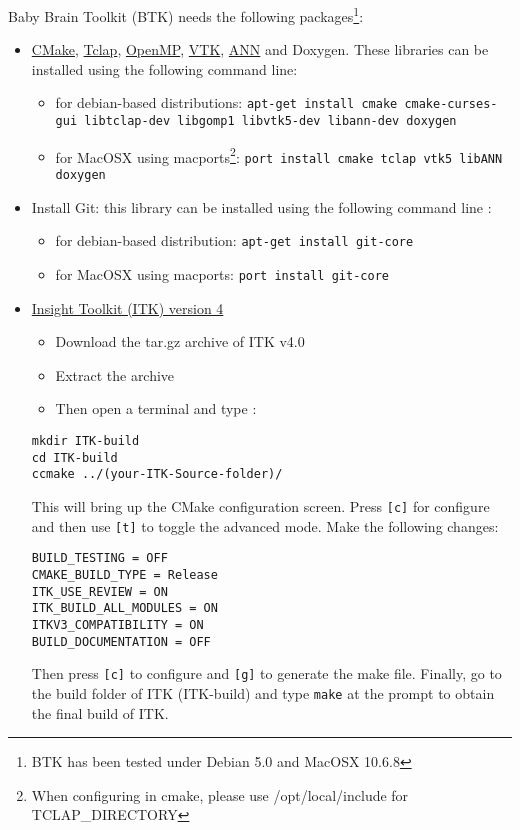 \documentclass[a4paper,10pt]{article}
\begin{document}
Baby Brain Toolkit (BTK) needs the following packages\footnote{BTK has been tested under Debian 5.0 and MacOSX 10.6.8}:
\begin{itemize}
 \item \href{http://www.cmake.org}{CMake}, \href{http://tclap.sourceforge.net}{Tclap}, \href{http://openmp.org}{OpenMP}, \href{http://www.vtk.org}{VTK}, \href{http://www.cs.umd.edu/\string~mount/ANN}{ANN} and Doxygen. These libraries can be installed using the following command line: 
 \begin{itemize}
 \item for debian-based distributions: \texttt{apt-get install cmake
cmake-curses-gui libtclap-dev libgomp1 libvtk5-dev libann-dev doxygen}
 \item for MacOSX using macports\footnote{When configuring in cmake, please use /opt/local/include for TCLAP\_DIRECTORY}: \texttt{port install cmake tclap vtk5 libANN doxygen}
 \end{itemize}
 \item Install Git: this library can be installed using the following command line : 
 \begin{itemize}
 \item for debian-based distribution: \texttt{apt-get install git-core}
 \item for MacOSX using macports: \texttt{port install git-core}
 \end{itemize}
 \item \href{http://www.itk.org/ITK/resources/software.html}{Insight Toolkit (ITK) version 4}
 \begin{itemize}
 \item Download the tar.gz archive of ITK v4.0
 \item Extract the archive 
 \item Then open a terminal and type :
 \end{itemize}
\begin{verbatim}
mkdir ITK-build
cd ITK-build
ccmake ../(your-ITK-Source-folder)/
\end{verbatim}
This will bring up the CMake configuration screen. Press \texttt{[c]} for
configure and then use \texttt{[t]} to toggle the advanced mode. Make the
following changes:
\begin{verbatim}
BUILD_TESTING = OFF
CMAKE_BUILD_TYPE = Release
ITK_USE_REVIEW = ON
ITK_BUILD_ALL_MODULES = ON
ITKV3_COMPATIBILITY = ON
BUILD_DOCUMENTATION = OFF
\end{verbatim}
Then press \texttt{[c]} to configure and \texttt{[g]} to generate the make file.
Finally, go to the build folder of ITK (ITK-build) and type \texttt{make} at the prompt to obtain the final build of ITK.

\end{itemize}
\end{document}
